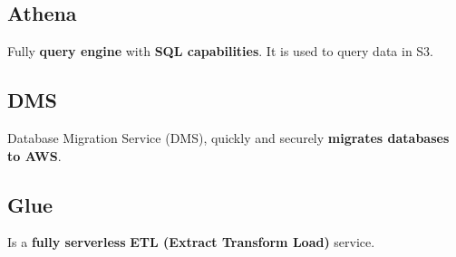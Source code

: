 \subsection{Athena}\label{subsec:athena}
Fully \textbf{query engine} with \textbf{SQL capabilities}\@.
It is used to query data in S3.

\subsection{DMS}\label{subsec:dms}
Database Migration Service (DMS), quickly and securely \textbf{migrates databases to AWS}\@.

\subsection{Glue}\label{subsec:glue}
Is a \textbf{fully serverless} \textbf{ETL (Extract Transform Load)} service.
